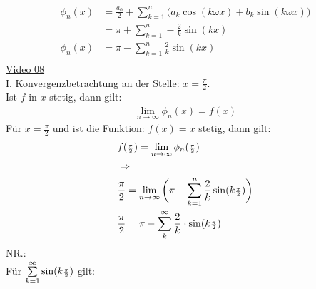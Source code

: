 \begin{align*}
\phi_n(x)&=\frac{a_0}{2}+\sum\limits_{k=1}^{n}\big(a_k\cos(k\omega x)+b_k\sin(k\omega x)\big)\\
&=\pi+\sum\limits_{k=1}^{n}-\frac{2}{k}\sin(kx)\\
\phi_n(x)&=\pi-\sum\limits_{k=1}^{n}\frac{2}{k}\sin(kx)\\
\end{align*}
\href{https://youtu.be/7VbdjMYAqLM}{Video 08}\\
\underline {I. Konvergenzbetrachtung an der Stelle: $ x=\frac{\pi}{2} $.}\\
Ist $ f $ in $ x $ stetig, dann gilt:\\
\begin{align*}
\lim\limits_ {n\to\infty}\phi_n(x)=f(x)
\end{align*}
Für $ x=\frac{\pi}{2} $ und ist die Funktion: $ f(x)=x $ stetig, dann gilt:\\
\begin{align*}
&f(\genfrac{}{}{}{2}{\pi}{2 })=\lim\limits_ {n\to\infty}\phi_n(\genfrac{}{}{}{2}{\pi }{2 })\\
&\Rightarrow\\
&\frac{\pi}{2}=\lim\limits_ {n\to\infty}\bigg(\pi-\sum\limits_{k=1}^{n}\frac{2}{k}\sin(k\genfrac{}{}{}{2}{\pi }{2 })\bigg)\\
&\frac{\pi}{2}=\pi-\sum\limits_{k}^{\infty}\frac{2}{k}\cdot \sin(k\genfrac{}{}{}{2}{\pi }{2 })
\end{align*}
NR.:\\
Für $ \sum\limits_{k=1}^{\infty} \sin(k\genfrac{}{}{}{2}{\pi }{2})$ gilt:\\
